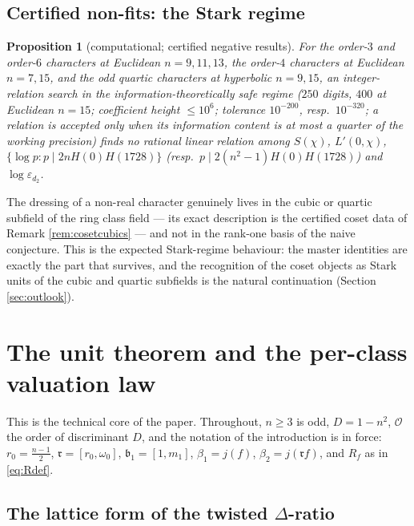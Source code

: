 \documentclass[11pt]{amsart}
\numberwithin{equation}{section}
\theoremstyle{plain}
\newtheorem{proposition}[theorem]{Proposition}
\theoremstyle{definition}
\theoremstyle{remark}
\newcommand{\idealb}{\mathfrak{b}}
\newcommand{\idealr}{\mathfrak{r}}
\newcommand{\lat}[1]{\left[#1\right]}
\newcommand{\Oc}{\mathcal{O}}
\newcommand{\eps}{\varepsilon}
\begin{document}
\subsection{Certified non-fits: the Stark regime}\label{subsec:nonfits}

\begin{proposition}[computational; certified negative results]
\label{prop:nonfits}
For the order-$3$ and order-$6$ characters at Euclidean $n = 9, 11, 13$,
the order-$4$ characters at Euclidean $n = 7, 15$, and the odd quartic
characters at hyperbolic $n = 9, 15$, an integer-relation search in the
information-theoretically safe regime ($250$ digits, $400$ at Euclidean
$n = 15$; coefficient height $\le 10^6$; tolerance $10^{-200}$, resp.\
$10^{-320}$; a relation is accepted only when its information content is
at most a quarter of the working precision) finds \emph{no} rational
linear relation among $S(\chi)$, $L'(0,\chi)$, $\{\log p : p \mid 2nH(0)
H(1728)\}$ (resp.\ $p \mid 2(n^2-1)H(0)H(1728)$) and $\log\eps_{d_2}$.
\end{proposition}

The dressing of a non-real character genuinely lives in the cubic or
quartic subfield of the ring class field --- its exact description is the
certified coset data of Remark \ref{rem:cosetcubics} --- and not in the
rank-one basis of the naive conjecture.  This is the expected Stark-regime
behaviour: the master identities are exactly the part that survives, and
the recognition of the coset objects as Stark units of the cubic and
quartic subfields \cite[Ch.~6--7]{Schertz2010} is the natural
continuation (Section \ref{sec:outlook}).

\section{The unit theorem and the per-class valuation law}\label{sec:unit}

This is the technical core of the paper.  Throughout, $n \ge 3$ is odd,
$D = 1 - n^2$, $\Oc$ the order of discriminant $D$, and the notation of
the introduction is in force: $r_0 = \tfrac{n-1}2$, $\idealr = \lat{r_0,
\omega_0}$, $\idealb_1 = \lat{1, m_1}$, $\beta_1 = j(f)$, $\beta_2 =
j(\idealr f)$, and $R_f$ as in \eqref{eq:Rdef}.

\subsection{The lattice form of the twisted $\Delta$-ratio}
\label{subsec:lattice}
\end{document}

